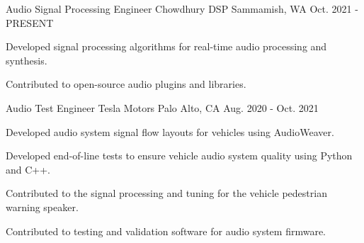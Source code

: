 

\begin{cventries}

  \cventry
    {Audio Signal Processing Engineer} %
    {Chowdhury DSP} %
    {Sammamish, WA} %
    {Oct. 2021 - PRESENT} %
    {
      \begin{cvitems} %
        \item {Developed signal processing algorithms for real-time audio processing and synthesis.}
        \item {Contributed to open-source audio plugins and libraries.}
      \end{cvitems}
    }

  \cventry
    {Audio Test Engineer} %
    {Tesla Motors} %
    {Palo Alto, CA} %
    {Aug. 2020 - Oct. 2021} %
    {
      \begin{cvitems} %
        \item {Developed audio system signal flow layouts for vehicles using AudioWeaver.}
        \item {Developed end-of-line tests to ensure vehicle audio system quality using Python and C++.}
        \item {Contributed to the signal processing and tuning for the vehicle pedestrian warning speaker.}
        \item {Contributed to testing and validation software for audio system firmware.}
      \end{cvitems}
    }


\end{cventries}
